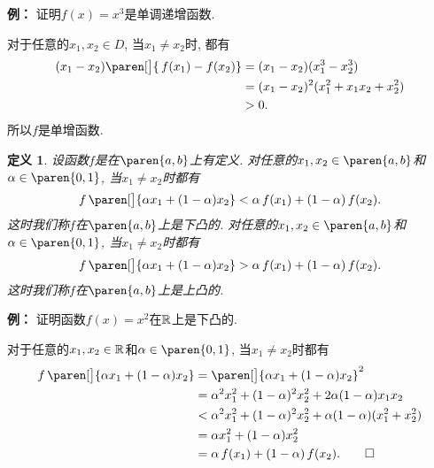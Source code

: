 \documentclass[a4paper,punct=CCT]{ctexbook}
\makeatletter
\theoremstyle{break}
\newtheorem*{definition*}{定义}
\renewenvironment{proof}[1][\proofname]{\par
  \pushQED{\qed}%
  \normalfont \topsep6\p@\@plus6\p@\relax
  \trivlist
  \item[]\ignorespaces
}{%
  \popQED\endtrivlist\@endpefalse
}
\newenvironment{example}[1][]{\noindent\textbf{例#1：}}{}
\makeatother
\begin{document}
\begin{example}
  证明\(f(x) = x^3\)是单调递增函数.

  \begin{proof}
    对于任意的\(x_1, x_2 \in D\), 当\(x_1 \ne x_2\)时, 都有
    \[
      \begin{split}
        (x_1 - x_2) \paren[\big]{\,f(x_1) - f(x_2)}
        &= (x_1 - x_2) (x_1^3 - x_2^3) \\
        &= (x_1 - x_2)^2 (x_1^2 + x_1 x_2 + x_2^2) \\
        &> 0.
      \end{split}
    \]
    所以\(f\)是单增函数.
  \end{proof}
\end{example}

\begin{definition*}
  设函数\(f\)是在\(\paren{a,b}\)上有定义.  对任意的\(x_1, x_2 \in \paren{a,b}\)和\(\alpha \in \paren{0,1}\), 当\(x_1 \ne x_2\)时都有
  \[
    f\,\paren[\big]{\alpha x_1 + (1-\alpha) x_2} < \alpha\,f(x_1) + (1-\alpha)\,f(x_2).
  \]
  这时我们称\(f\)在\(\paren{a,b}\)上是下凸的.  对任意的\(x_1, x_2 \in \paren{a,b}\)和\(\alpha \in \paren{0,1}\), 当\(x_1 \ne x_2\)时都有
  \[
    f\,\paren[\big]{\alpha x_1 + (1-\alpha) x_2} > \alpha\,f(x_1) + (1-\alpha)\,f(x_2).
  \]
  这时我们称\(f\)在\(\paren{a,b}\)上是上凸的.
\end{definition*}

\begin{example}
  证明函数\(f(x) = x^2\)在\(\mathbb{R}\)上是下凸的.

  \begin{proof}
    对于任意的\(x_1, x_2 \in \mathbb{R}\)和\(\alpha \in \paren{0,1}\), 当\(x_1 \ne x_2\)时都有
    \[
      \begin{split}
        f\,\paren[\big]{\alpha x_1 + (1-\alpha) x_2}
        &= \paren[\big]{\alpha x_1 + (1-\alpha) x_2}^2 \\
        &= \alpha^2 x_1^2 + (1-\alpha)^2 x_2^2 + 2 \alpha (1-\alpha) x_1 x_2 \\
        &< \alpha^2 x_1^2 + (1-\alpha)^2 x_2^2 + \alpha (1-\alpha) (x_1^2 + x_2^2) \\
        &= \alpha x_1^2 + (1-\alpha) x_2^2 \\
        &= \alpha\,f(x_1) + (1-\alpha)\,f(x_2). \qedhere
      \end{split}
    \]
  \end{proof}
\end{example}
\end{document}
